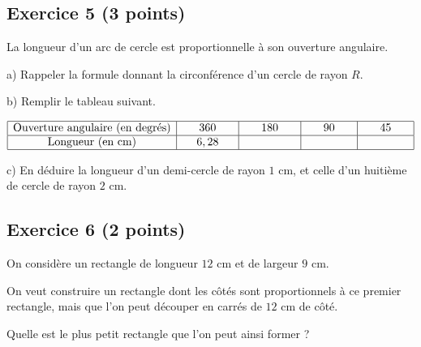\documentclass[14 pt]{extarticle}
\theoremstyle{plain}
\begin{document}
 \subsection*{Exercice 5 (3 points)} 

La longueur d'un arc de cercle est proportionnelle à son ouverture angulaire. 

a) Rappeler la formule donnant la circonférence d'un cercle de rayon $R$. 

b) Remplir le tableau suivant. 

$\renewcommand{\arraystretch}{1}
\begin{array}{|c|c|c|c|c|}
\hline
\text{Ouverture angulaire (en degrés)} & 
\phantom{000}360\phantom{000} & \phantom{000}180\phantom{000} & \phantom{000} 90 \phantom{000}&\phantom{000} 45 \phantom{000} \\
\hline \text{Longueur (en cm)}
& 6,28 &   & & \\
\hline
\end{array}
\renewcommand{\arraystretch}{1}$

c) En déduire la longueur d'un demi-cercle de rayon $1$ cm, et celle d'un huitième de cercle de rayon $2$ cm. 
          
  \subsection*{Exercice 6 (2 points)}

On considère un rectangle de longueur $12$ cm et de largeur $9$ cm. 

On veut construire un rectangle dont les côtés sont proportionnels à ce premier rectangle, mais que l'on peut découper en carrés de $12$ cm de côté. 

Quelle est le plus petit rectangle que l'on peut ainsi former ? 



 	
\end{document}

